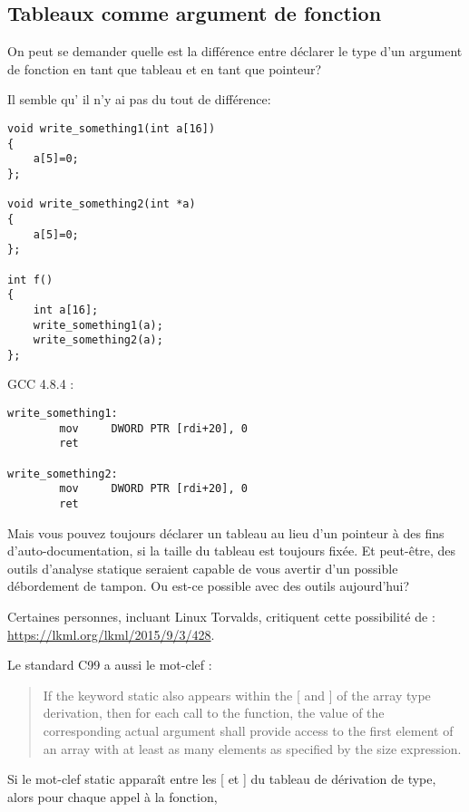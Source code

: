 \subsection{Tableaux comme argument de fonction}

On peut se demander quelle est la différence entre déclarer le type d'un argument
de fonction en tant que tableau et en tant que pointeur?

Il semble qu' il n'y ai pas du tout de différence:

\begin{lstlisting}[style=customc]
void write_something1(int a[16])
{
	a[5]=0;
};

void write_something2(int *a)
{
	a[5]=0;
};

int f()
{
	int a[16];
	write_something1(a);
	write_something2(a);
};
\end{lstlisting}

GCC 4.8.4 \Optimizing:

\begin{lstlisting}[style=customasmx86]
write_something1:
        mov     DWORD PTR [rdi+20], 0
        ret

write_something2:
        mov     DWORD PTR [rdi+20], 0
        ret
\end{lstlisting}

Mais vous pouvez toujours déclarer un tableau au lieu d'un pointeur à des fins d'auto-documentation,
si la taille du tableau est toujours fixée.
Et peut-être, des outils d'analyse statique seraient capable de vous avertir d'un
possible débordement de tampon.
Ou est-ce possible avec des outils aujourd'hui?

Certaines personnes, incluant Linux Torvalds, critiquent cette possibilité de \CCpp:
\url{https://lkml.org/lkml/2015/9/3/428}.

Le standard C99 a aussi le mot-clef  :

\begin{framed}
\begin{quotation}
If the keyword static also appears  within the [ and ] of the array type derivation, then for each call to the function, the value of the corresponding actual argument shall provide access to the first element of an array with at least as many elements as specified by the size expression.
\end{quotation}
\end{framed}
Si le mot-clef static apparaît entre les [ et ] du tableau de dérivation de type, alors pour chaque appel à la fonction,

